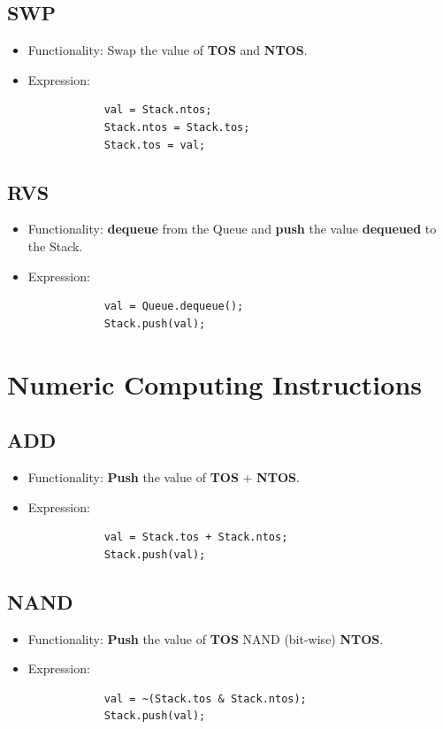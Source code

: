 \documentclass[11pt]{report}
\begin{document}
    \subsection{SWP}
    \begin{itemize}
        \item Functionality: Swap the value of \textbf{TOS} and \textbf{NTOS}.
        \item Expression:
        \begin{verbatim}
            val = Stack.ntos;
            Stack.ntos = Stack.tos;
            Stack.tos = val;
        \end{verbatim}
    \end{itemize}

    \subsection{RVS}
    \begin{itemize}
        \item Functionality: \textbf{dequeue} from the Queue and \textbf{push} the value 
                    \textbf{dequeued} to the Stack.
        \item Expression:
        \begin{verbatim}
            val = Queue.dequeue();
            Stack.push(val);
        \end{verbatim}
    \end{itemize}

    \section{Numeric Computing Instructions}
    \subsection{ADD}
    \begin{itemize}
        \item Functionality: \textbf{Push} the value of \textbf{TOS} + \textbf{NTOS}.
        \item Expression:
        \begin{verbatim}
            val = Stack.tos + Stack.ntos;
            Stack.push(val);
        \end{verbatim}
    \end{itemize}

    \subsection{NAND}
    \begin{itemize}
        \item Functionality: \textbf{Push} the value of \textbf{TOS} NAND (bit-wise) \textbf{NTOS}.
        \item Expression:
        \begin{verbatim}
            val = ~(Stack.tos & Stack.ntos);
            Stack.push(val);
        \end{verbatim}
    \end{itemize}
\end{document}
